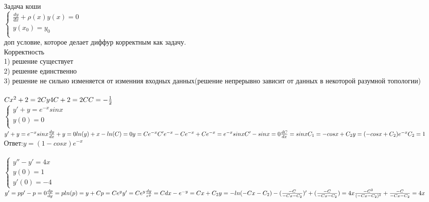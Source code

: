 \documentclass[a4paper]{article}
\begin{document}
    












    \newpage
    Задача коши\\
    $\begin{cases}
        \frac{dy}{dx}+\rho(x)y(x)=0\\
        y(x_0)=y_0\\
    \end{cases}$\\
    доп условие, которое делает диффур корректным как задачу.\\
    Корректность\\
    1) решение существует\\
    2) решение единственно\\
    3) решение не сильно изменяется от изменния входных данных(решение непрерывно зависит от данных в некоторой разумной топологии)\\\\

    $Cx^2+2=2Cy\\
    4C+2=2C\\
    C=-\frac{1}{2}\\$\\
    $\begin{cases}
        y'+y=e^{-x}sinx\\
        y(0)=0\\
    \end{cases}$\\
    $y'+y=e^{-x}sinx\\
    \frac{dy}{dx}+y=0\\
    ln(y)+x-ln(C)=0\\
    y=Ce^{-x}\\
    C'e^{-x}-Ce^{-x}+Ce^{-x}=e^{-x}sinx\\
    C'-sinx=0\\
    \frac{dC}{dx}=sinx\\
    C_1=-cosx+C_2\\
    y=(-cosx+C_2)e^{-x}\\
    C_2=1\\$
    Ответ:$y=(1-cosx)e^{-x}$\\\\
    $\begin{cases}
        y''-y'=4x\\
        y(0)=1\\
        y'(0)=-4
    \end{cases}$\\
    $y'=p\\
    p'-p=0\\
    \frac{dp}{dy}=p\\
    ln(p)=y+C\\
    p=Ce^{y}\\
    y'=Ce^y\\
    \frac{dy}{e^y}=Cdx\\
    -e^{-y}=Cx+C_2\\
    y=-ln(-Cx-C_2)\\
    -(\frac{-C}{-Cx-C_2})'+(\frac{-C}{-Cx-C_2})=4x\\
    \frac{-C^2}{(-Cx-C_2)^2}+\frac{-C}{-Cx-C_2}=4x$
\end{document}
